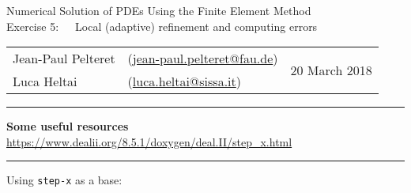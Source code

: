 \documentclass[11pt,answers]{exam}
\makeatletter
\newcommand{\makeheader}[3]{%
\setcounter{question}{0}
\begin{center}
{\sc Numerical Solution of PDEs Using the Finite Element Method}\vspace{2ex}\\
{\sc Exercise #1:\ \ \ #2}\vspace{2ex}\\
\begin{tabular*}{\textwidth}{ll @{\extracolsep{\fill}}r}
Jean-Paul Pelteret & (\url{jean-paul.pelteret@fau.de}) & \multirow{2}{*}{#3} \\
Luca Heltai & (\url{luca.heltai@sissa.it}) & \\
\end{tabular*}
\end{center}
}
\newcommand{\makeresources}[1]{%
\rule{\textwidth}{0.6mm}
\textbf{Some useful resources}\\[1.5ex]
#1 \\
\rule{\textwidth}{0.6mm}
}
\makeatother
\begin{document}


\clearpage
\makeheader{5}{Local (adaptive) refinement and computing errors}{20 March 2018}
\makeresources{%
\url{https://www.dealii.org/8.5.1/doxygen/deal.II/step_x.html}
}

\begin{questions}

\question Using \verb|step-x| as a base:



\end{questions}
\end{document}
